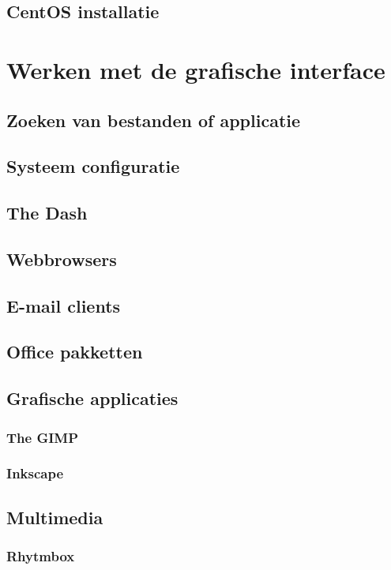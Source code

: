 \documentclass[a4paper,12pt,twoside,openright,titlepage]{book}
\begin{document}
\section{CentOS installatie}


\chapter{Werken met de grafische interface}

\section{Zoeken van bestanden of applicatie}

\section{Systeem configuratie}

\section{The Dash}

\section{Webbrowsers}

\section{E-mail clients}

\section{Office pakketten}

\section{Grafische applicaties}

\subsection{The GIMP}

\subsection{Inkscape}

\section{Multimedia}
\subsection{Rhytmbox}
\end{document}
